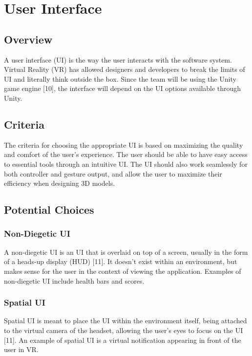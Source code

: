 \documentclass[letterpaper,10pt,onecolumn,compsoc]{IEEEtran}
\begin{document}
\newpage

\section{User Interface}

\subsection{Overview}
A user interface (UI) is the way the user interacts with the software system. Virtual Reality (VR) has allowed designers and developers to break the limits of UI and literally think outside the box. Since the team will be using the Unity game engine [10], the interface will depend on the UI options available through Unity. 

\subsection{Criteria}
The criteria for choosing the appropriate UI is based on maximizing the quality and comfort of the user’s experience. The user should be able to have easy access to essential tools through an intuitive UI. The UI should also work seamlessly for both controller and gesture output, and allow the user to maximize their efficiency when designing 3D models.

\subsection{Potential Choices}

\subsubsection{Non-Diegetic UI}
A non-diegetic UI is an UI that is overlaid on top of a screen, usually in the form of a heads-up display (HUD) [11].  It doesn’t exist within an environment, but makes sense for the user in the context of viewing the application. Examples of non-diegetic UI include health bars and scores. 

\subsubsection{Spatial UI}
Spatial UI is meant to place the UI within the environment itself, being attached to the virtual camera of the headset, allowing the user’s eyes to focus on the UI [11]. An example of spatial UI is a virtual notification appearing in front of the user in VR.
\end{document}
